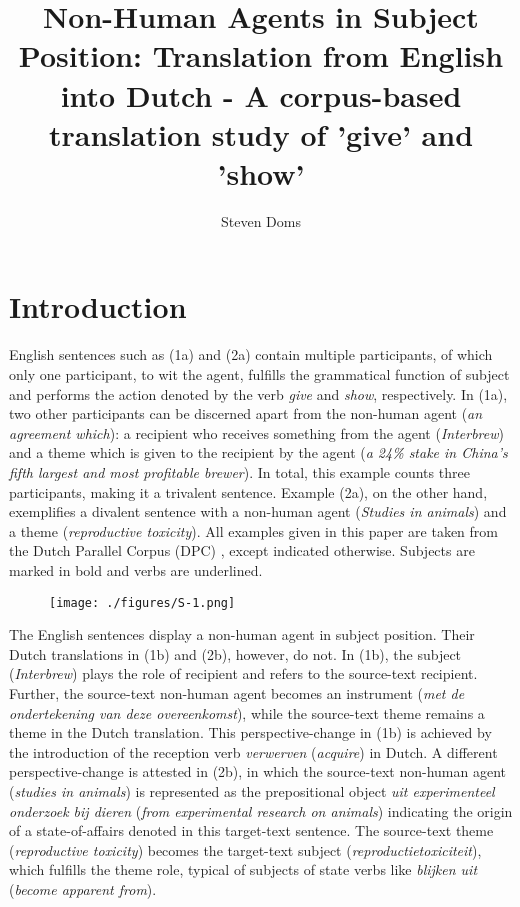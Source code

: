 \documentclass[output=paper]{LSP/langsci}
\author{Steven Doms}
\title{Non-Human Agents in Subject Position: Translation from English into Dutch - A corpus-based translation study of 'give' and 'show'}
\begin{document}
\section{Introduction}
English sentences such as (1a) and (2a) contain multiple participants, of which only one participant, to wit the agent, fulfills the grammatical function of subject and performs the action denoted by the verb \textit{give} and \textit{show}, respectively. In (1a), two other participants can be discerned apart from the non-human agent (\textit{an agreement which}): a recipient who receives something from the agent (\textit{Interbrew}) and a theme which is given to the recipient by the agent (\textit{a 24\% stake in China’s fifth largest and most profitable brewer}). In total, this example counts three participants, making it a trivalent sentence. Example (2a), on the other hand, exemplifies a divalent sentence with a non-human agent (\textit{Studies in animals}) and a theme (\textit{reproductive toxicity}). All examples given in this paper are taken from the Dutch Parallel Corpus (DPC) \citep[see][]{Rura2008}, except indicated otherwise. Subjects are marked in bold and verbs are underlined.

\begin{figure}
\texttt{[image: ./figures/S-1.png]}
\end{figure}

The English sentences display a non-human agent in subject position. Their Dutch translations in (1b) and (2b), however, do not. In (1b), the subject (\textit{Interbrew}) plays the role of recipient and refers to the source-text recipient. Further, the source-text non-human agent becomes an instrument (\textit{met de ondertekening van deze overeenkomst}), while the source-text theme remains a theme in the Dutch translation. This perspective-change in (1b) is achieved by the introduction of the reception verb \textit{verwerven} (\textit{acquire}) in Dutch. A different perspective-change is attested in (2b), in which the source-text non-human agent (\textit{studies in animals}) is represented as the prepositional object \textit{uit experimenteel onderzoek bij dieren} (\textit{from experimental research on animals}) indicating the origin of a state-of-affairs denoted in this target-text sentence. The source-text theme (\textit{reproductive toxicity}) becomes the target-text subject (\textit{reproductietoxiciteit}), which fulfills the theme role, typical of subjects of state verbs like \textit{blijken uit} (\textit{become apparent from}).
\end{document}
